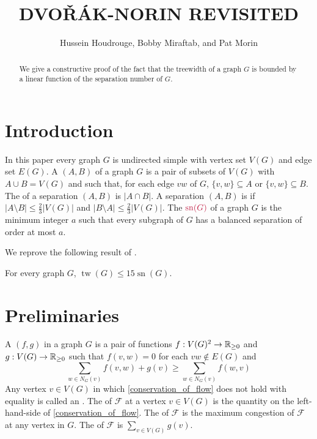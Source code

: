 \documentclass{patmorin}
\title{\MakeUppercase{Dvo\v{r}ák-Norin Revisited}}
\author{Hussein Houdrouge, Bobby Miraftab, and Pat Morin}
\date{}
\DeclareMathOperator{\sep}{sn}
\DeclareMathOperator{\tw}{tw}
\begin{document}
\maketitle

\begin{abstract}
  We give a constructive proof of the fact that the treewidth of a graph $G$ is bounded by a linear function of the separation number of $G$.
\end{abstract}


\section{Introduction}

In this paper every graph $G$ is undirected simple with vertex set $V(G)$ and edge set $E(G)$.  A  $(A,B)$ of a graph $G$ is a pair of subsets of $V(G)$ with $A\cup B= V(G)$ and such that, for each edge $vw$ of $G$, $\{v,w\}\subseteq A$ or $\{v,w\}\subseteq B$.  The  of a separation $(A,B)$ is $|A\cap B|$.  A separation $(A,B)$ is  if $|A\setminus B|\le \tfrac{2}{3}|V(G)|$ and $|B\setminus A|\le \tfrac{2}{3}|V(G)|$.  The  $\mathdefin{\sep(G)}$ of a graph $G$ is the minimum integer $a$ such that every subgraph of $G$ has a balanced separation of order at most $a$.

We reprove the following result of \citet{dvorak.norin:treewidth}.
\begin{thm}
  For every graph $G$, $\tw(G)\le 15\sep(G)$.
\end{thm}



\section{Preliminaries}


A  $(f,g)$ in a graph $G$ is a pair of functions $f:V(G)^2\to\mathbb{R}_{\ge 0}$ and $g:V(G)\to\mathbb{R}_{\ge 0}$ such that $f(v,w)=0$ for each $vw\not\in E(G)$ and
\begin{equation}
  \sum_{w\in N_G(v)} f(v,w) + g(v) \ge \sum_{w\in N_G(v)} f(w,v)
  \label{conservation_of_flow}
\end{equation}
Any vertex $v\in V(G)$ in which \eqref{conservation_of_flow} does not hold with equality is called an .  The  of $\mathcal{F}$ at a vertex $v\in V(G)$ is the quantity on the left-hand-side of \eqref{conservation_of_flow}.  The  of $\mathcal{F}$ is the maximum congestion of $\mathcal{F}$ at any vertex in $G$.  The  of $\mathcal{F}$ is $\sum_{v\in V(G)} g(v)$.
\end{document}

